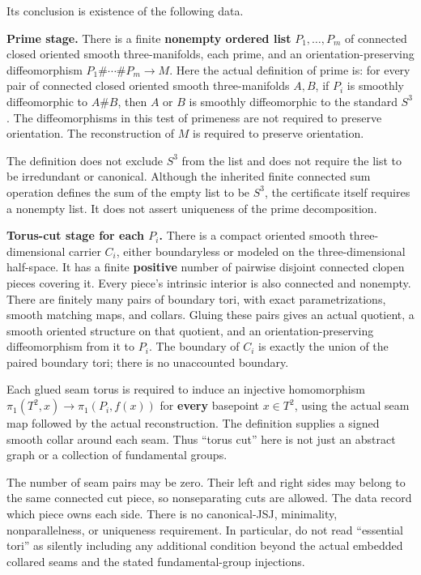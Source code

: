 \documentclass[
  letterpaper,
  11pt]{article}
\begin{document}
Its conclusion is existence of the following data.

\textbf{Prime stage.} There is a finite \textbf{nonempty ordered list}
\(P_1,\ldots,P_m\) of connected closed oriented smooth three-manifolds,
each prime, and an orientation-preserving diffeomorphism
\(P_1\#\cdots\#P_m\longrightarrow M\). Here the actual definition of
prime is: for every pair of connected closed oriented smooth
three-manifolds \(A,B\), if \(P_i\) is smoothly diffeomorphic to
\(A\#B\), then \(A\) or \(B\) is smoothly diffeomorphic to the standard
\(S^3\). The diffeomorphisms in this test of primeness are not required
to preserve orientation. The reconstruction of \(M\) is required to
preserve orientation.

The definition does not exclude \(S^3\) from the list and does not
require the list to be irredundant or canonical. Although the inherited
finite connected sum operation defines the sum of the empty list to be
\(S^3\), the certificate itself requires a nonempty list. It does not
assert uniqueness of the prime decomposition.

\textbf{Torus-cut stage for each \(P_i\).} There is a compact oriented
smooth three-dimensional carrier \(C_i\), either boundaryless or modeled
on the three-dimensional half-space. It has a finite \textbf{positive}
number of pairwise disjoint connected clopen pieces covering it. Every
piece's intrinsic interior is also connected and nonempty. There are
finitely many pairs of boundary tori, with exact parametrizations,
smooth matching maps, and collars. Gluing these pairs gives an actual
quotient, a smooth oriented structure on that quotient, and an
orientation-preserving diffeomorphism from it to \(P_i\). The boundary
of \(C_i\) is exactly the union of the paired boundary tori; there is no
unaccounted boundary.

Each glued seam torus is required to induce an injective homomorphism
\(\pi_1(T^2,x)\to\pi_1(P_i,f(x))\) for \textbf{every} basepoint
\(x\in T^2\), using the actual seam map followed by the actual
reconstruction. The definition supplies a signed smooth collar around
each seam. Thus ``torus cut'' here is not just an abstract graph or a
collection of fundamental groups.

The number of seam pairs may be zero. Their left and right sides may
belong to the same connected cut piece, so nonseparating cuts are
allowed. The data record which piece owns each side. There is no
canonical-JSJ, minimality, nonparallelness, or uniqueness requirement.
In particular, do not read ``essential tori'' as silently including any
additional condition beyond the actual embedded collared seams and the
stated fundamental-group injections.
\end{document}
